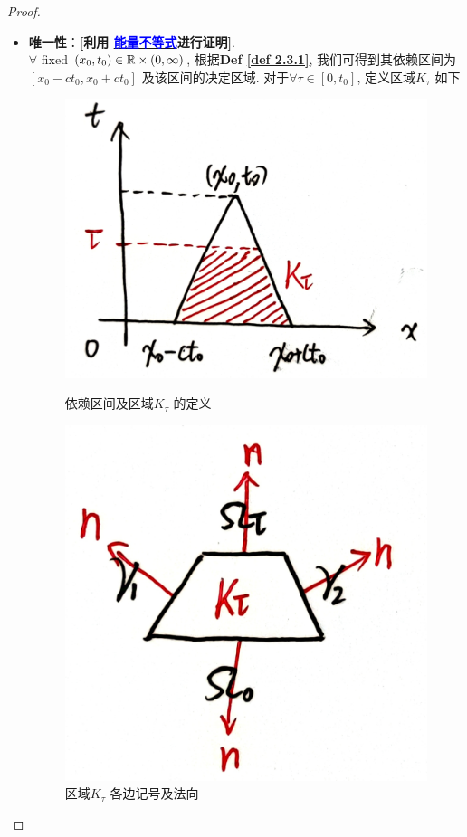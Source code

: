 \begin{thm}
\begin{proof}
\begin{itemize}
				\newpage
				
				\item \textbf{唯一性}：\textbf{[利用 \underline{\textcolor{blue}{能量不等式}}进行证明]}. \\
				$\forall$ fixed $(x_0 , t_0) \in \mathbb{R} \times (0 , \infty)$, 根据\textbf{Def \ref{def 2.3.1}}, 我们可得到其依赖区间为$[x_0 - ct_0 , x_0 + ct_0]$ 及该区间的决定区域. 对于$\forall \tau \in [0 , t_0]$, 定义区域$K_\tau$ 如下
				
				\begin{figure}[thbp!]
					\centering
					\begin{minipage}[t]{0.59\linewidth}
						\centering
						\includegraphics[width=0.6\linewidth]{figure/2.3-4}
						\caption{依赖区间及区域$K_\tau$ 的定义}
						\label{fig : 2.3-4}
					\end{minipage}
					\begin{minipage}[t]{0.39\linewidth}
						\centering
						\includegraphics[width=0.5\linewidth]{figure/2.3-5}
						\caption{区域$K_\tau$ 各边记号及法向}
						\label{fig : 2.3-5}
					\end{minipage}
				\end{figure}
				

\end{itemize}
\end{proof}
\end{thm}
